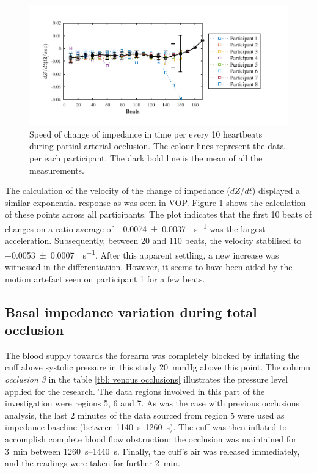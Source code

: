 \begin{figure}[!t]
	\centering
	\includegraphics[width=15cm,keepaspectratio]{figure_vop_6}    
	\caption[Rate of change of impedance per 10 heartbeats during partial arterial occlusion]{Speed of change of impedance in time per every 10 heartbeats during partial arterial occlusion. The colour lines represent the data per each participant. The dark bold line is the mean of all the measurements.}
	\label{fig:arterial occlusion change}
\end{figure}  

The calculation of the velocity of the change of impedance ($dZ/dt$) displayed a similar exponential response as was seen in VOP. Figure \ref{fig:arterial occlusion change} shows the calculation of these points across all participants. The plot indicates that the first 10 beats of changes on a ratio average of \SI{-0.0074(00037)}{\Omega\per\second} was the largest acceleration. Subsequently, between 20 and 110 beats, the velocity stabilised to \SI{-0.0053(00007)}{\Omega\per\second}. After this apparent settling, a new increase was witnessed in the differentiation. However, it seems to have been aided by the motion artefact seen on participant 1 for a few beats.

\subsection{Basal impedance variation during total occlusion}
\label{section occlusion 1.3}
The blood supply towards the forearm was completely blocked by inflating the cuff above systolic pressure in this study \SI{20}{\mmHg} above this point. The column \textit{occlusion 3} in the table \ref{tbl: venous occlusions} illustrates the pressure level applied for the research. The data regions involved in this part of the investigation were regions 5, 6 and 7. As was the case with previous occlusions analysis, the last 2 minutes of the data sourced from region 5 were used as impedance baseline (between \SIrange{1140}{1260}{\second}). The cuff was then inflated to accomplish complete blood flow obstruction; the occlusion was maintained for \SI{3}{\minute} between \SIrange{1260}{1440}{\second}. Finally, the cuff's air was released immediately, and the readings were taken for further \SI{2}{\minute}.

